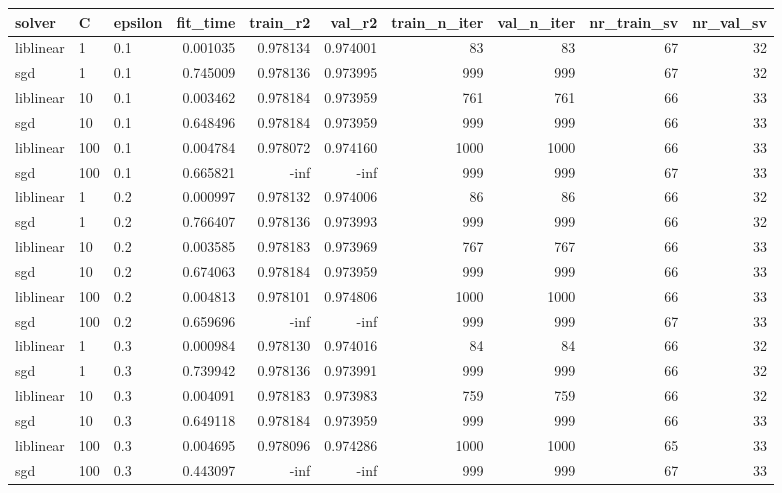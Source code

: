 \begin{tabular}{lllrrrrrrr}
\toprule
   solver &   C & epsilon &  fit\_time &  train\_r2 &   val\_r2 &  train\_n\_iter &  val\_n\_iter &  nr\_train\_sv &  nr\_val\_sv \\
\midrule
liblinear &   1 &     0.1 &  0.001035 &  0.978134 & 0.974001 &            83 &          83 &           67 &         32 \\
      sgd &   1 &     0.1 &  0.745009 &  0.978136 & 0.973995 &           999 &         999 &           67 &         32 \\
liblinear &  10 &     0.1 &  0.003462 &  0.978184 & 0.973959 &           761 &         761 &           66 &         33 \\
      sgd &  10 &     0.1 &  0.648496 &  0.978184 & 0.973959 &           999 &         999 &           66 &         33 \\
liblinear & 100 &     0.1 &  0.004784 &  0.978072 & 0.974160 &          1000 &        1000 &           66 &         33 \\
      sgd & 100 &     0.1 &  0.665821 &      -inf &     -inf &           999 &         999 &           67 &         33 \\
liblinear &   1 &     0.2 &  0.000997 &  0.978132 & 0.974006 &            86 &          86 &           66 &         32 \\
      sgd &   1 &     0.2 &  0.766407 &  0.978136 & 0.973993 &           999 &         999 &           66 &         32 \\
liblinear &  10 &     0.2 &  0.003585 &  0.978183 & 0.973969 &           767 &         767 &           66 &         33 \\
      sgd &  10 &     0.2 &  0.674063 &  0.978184 & 0.973959 &           999 &         999 &           66 &         33 \\
liblinear & 100 &     0.2 &  0.004813 &  0.978101 & 0.974806 &          1000 &        1000 &           66 &         33 \\
      sgd & 100 &     0.2 &  0.659696 &      -inf &     -inf &           999 &         999 &           67 &         33 \\
liblinear &   1 &     0.3 &  0.000984 &  0.978130 & 0.974016 &            84 &          84 &           66 &         32 \\
      sgd &   1 &     0.3 &  0.739942 &  0.978136 & 0.973991 &           999 &         999 &           66 &         32 \\
liblinear &  10 &     0.3 &  0.004091 &  0.978183 & 0.973983 &           759 &         759 &           66 &         32 \\
      sgd &  10 &     0.3 &  0.649118 &  0.978184 & 0.973959 &           999 &         999 &           66 &         33 \\
liblinear & 100 &     0.3 &  0.004695 &  0.978096 & 0.974286 &          1000 &        1000 &           65 &         33 \\
      sgd & 100 &     0.3 &  0.443097 &      -inf &     -inf &           999 &         999 &           67 &         33 \\
\bottomrule
\end{tabular}
